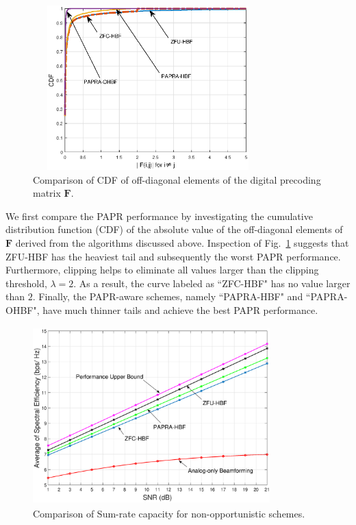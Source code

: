 \documentclass[conference]{IEEEtran}
\begin{document}
\begin{figure}[ht]
	\begin{center}
	\includegraphics[width=3.5in,height=2.5in]{Figure/cdf2.eps}
	\caption{Comparison of CDF of off-diagonal elements of the digital precoding matrix ${\bm F}$.}\label{fig:CDF}
    \end{center}
\end{figure}

We first compare the PAPR performance by investigating the cumulative distribution function (CDF) of the absolute value of the off-diagonal elements of ${\bm F}$ derived from the algorithms discussed above. Inspection of Fig.~\ref{fig:CDF} suggests that ZFU-HBF has the heaviest tail and subsequently the worst PAPR performance. Furthermore, clipping helps to eliminate all values larger than the clipping threshold, {\em $\lambda=2$}. As a result, the curve labeled as ``ZFC-HBF" has no value larger than $2$. Finally, the PAPR-aware schemes, namely ``PAPRA-HBF" and ``PAPRA-OHBF", have much thinner tails and achieve the best PAPR performance.

\begin{figure}[ht]
 	\begin{center}
 	\includegraphics[width=3.6in,height=2.7in]{Figure/SpectralEffNoSelection3.eps}
 	\caption{Comparison of Sum-rate capacity for non-opportunistic schemes.}\label{fig:SpectralEffNoSelection}
    \end{center}
\end{figure}
\end{document}
